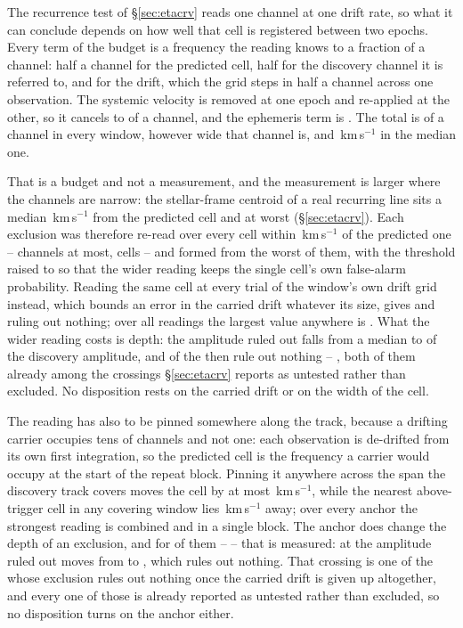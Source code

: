 The recurrence test of \S\ref{sec:etacrv} reads one channel at one drift
rate, so what it can conclude depends on how well that cell is registered
between two epochs. Every term of the budget is a frequency the reading
knows to a fraction of a channel: half a channel for the predicted cell,
half for the discovery channel it is referred to, and \RgDriftWithinChMed{}
for the drift, which the grid steps in half a channel across one
observation. The systemic velocity is removed at one epoch and re-applied at
the other, so it cancels to \RgVsysChMax{} of a channel, and the ephemeris
term is \RgBaryChMax. The total is \RgBudgetChMed{} of a channel in every
window, however wide that channel is, and \RgBudgetKmsMed\,km\,s$^{-1}$ in
the median one.

That is a budget and not a measurement, and the measurement is larger where
the channels are narrow: the stellar-frame centroid of a real recurring line
sits a median \RgCenMedKms\,km\,s$^{-1}$ from the predicted cell and
\RgCenMaxKms{} at worst (\S\ref{sec:etacrv}). Each exclusion was
therefore re-read over every cell within \RgTolKms\,km\,s$^{-1}$ of the
predicted one -- \RgTolChMax{} channels at most, \RgNTrialMax{} cells -- and
formed from the worst of them, with the threshold raised to \RgThrMax{} so
that the wider reading keeps the single cell's own false-alarm probability.
Reading the same cell at every trial of the window's own drift grid instead,
which bounds an error in the carried drift whatever its size, gives
\ZtFracWideMed{} and \ZtNWideVac{} ruling out nothing; over all
\RcNRepeatMeas{} readings the largest value anywhere is \RcTMax.
What the wider reading costs is depth: the amplitude ruled out falls from a
median \RcFracMed{} to \RgFracMed{} of the discovery amplitude, and
\RgNVac{} of the \RcNExcl{} then rule out nothing -- \RgVacList, both of them
already among the \HjNPowerLo{} crossings \S\ref{sec:etacrv} reports as
untested rather than excluded. No disposition rests on the carried drift or
on the width of the cell.

The reading has also to be pinned somewhere along the track, because a
drifting carrier occupies tens of channels and not one: each observation is
de-drifted from its own first integration, so the predicted cell is the
frequency a carrier would occupy at the start of the repeat block. Pinning it
anywhere across the span the discovery track covers moves the cell by at most
\AnSpanMaxKms\,km\,s$^{-1}$, while the nearest above-trigger cell in any
covering window lies \AnNearKms\,km\,s$^{-1}$ away; over every anchor the
strongest reading is \AnTBest{} combined and \AnTSingle{} in a single block.
The anchor does change the depth of an exclusion, and for \AnNMeas{} of them
-- \AnMeasStars{} -- that is measured: at \AnWorstStar{} the amplitude ruled
out moves from \AnFracFrom{} to \AnFracTo, which rules out nothing. That
crossing is one of the \AnNWideVac{} whose exclusion rules out nothing once
the carried drift is given up altogether, and every one of those is already
reported as untested rather than excluded, so no disposition turns on the
anchor either.


